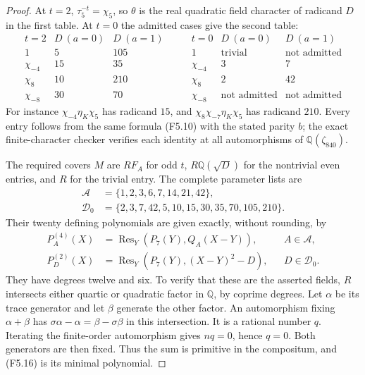 \begin{proof}
At $t=2$, $\tau_5^{-t}=\chi_5$, so $\theta$ is the real
quadratic field character of radicand $D$ in the first table.
At $t=0$ the admitted cases give the second table:
\[
 \begin{array}{c|cc}
 t=2& D\ (a=0)&D\ (a=1)\\\hline
 1&5&105\\
 \chi_{-4}&15&35\\
 \chi_8&10&210\\
 \chi_{-8}&30&70
 \end{array}
 \qquad
 \begin{array}{c|cc}
 t=0& D\ (a=0)&D\ (a=1)\\\hline
 1&\text{trivial}&\text{not admitted}\\
 \chi_{-4}&3&7\\
 \chi_8&2&42\\
 \chi_{-8}&\text{not admitted}&\text{not admitted}
 \end{array}\tag{F5.14}
\]
For instance $\chi_{-4}\eta_K\chi_5$ has radicand $15$,
and $\chi_8\chi_{-7}\eta_K\chi_5$ has radicand $210$.
Every entry follows from the same formula (F5.10) with the
stated parity $b$; the exact finite-character checker verifies
each identity at all automorphisms of $\mathbb Q(\zeta_{840})$.

The required covers $M$ are $RF_A$ for odd $t$,
$R\mathbb Q(\sqrt D)$ for the nontrivial even entries, and
$R$ for the trivial entry. The complete parameter lists are
\[
 \begin{split}
 \mathcal A&=\{1,2,3,6,7,14,21,42\},\\
 \mathcal D_0&=\{2,3,7,42,5,10,15,30,35,70,105,210\}.
 \end{split}\tag{F5.15}
\]
Their twenty defining polynomials are given exactly, without
rounding, by
\[
 \begin{aligned}
 P_A^{(4)}(X)&=\operatorname{Res}_Y(P_7(Y),Q_A(X-Y)),
                                      &&A\in\mathcal A,\\
 P_D^{(2)}(X)&=\operatorname{Res}_Y(P_7(Y),(X-Y)^2-D),
                                      &&D\in\mathcal D_0.
 \end{aligned}\tag{F5.16}
\]
They have degrees twelve and six. To verify that these are
the asserted fields, $R$ intersects either quartic or quadratic
factor in $\mathbb Q$, by coprime degrees. Let $\alpha$ be
its trace generator and let $\beta$ generate the other factor.
An automorphism fixing $\alpha+\beta$ has
$\sigma\alpha-\alpha=\beta-\sigma\beta$ in this intersection.
It is a rational number $q$. Iterating the finite-order
automorphism gives $nq=0$, hence $q=0$. Both generators are
then fixed. Thus the sum is primitive in the compositum,
and (F5.16) is its minimal polynomial.


\end{proof}
